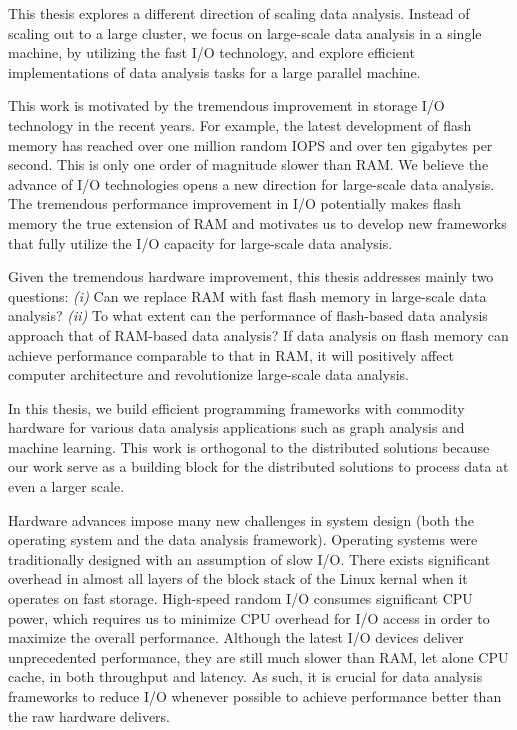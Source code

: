 This thesis explores a different direction of scaling data analysis. Instead
of scaling out to a large cluster, we focus on large-scale data analysis in
a single machine, by utilizing the fast I/O technology, and explore
efficient implementations of data analysis tasks for a large parallel machine.

This work is motivated
by the tremendous improvement in storage I/O technology in the recent years.
For example, the latest development of flash memory \cite{fusionio, safs} has
reached over one million random IOPS and over ten gigabytes per second. This
is only one order of magnitude slower than RAM. We believe the advance of
I/O technologies opens a new direction for large-scale data analysis.
The tremendous performance
improvement in I/O potentially makes flash memory the true extension of RAM
and motivates us to develop new frameworks that fully utilize the I/O capacity
for large-scale data analysis.

Given the tremendous hardware improvement, this thesis addresses mainly two
questions: \textit{(i)} Can we replace RAM with fast flash memory in large-scale
data analysis? \textit{(ii)} To what extent
can the performance of flash-based data analysis approach that of RAM-based
data analysis? If data analysis on flash memory can achieve performance comparable to
that in RAM, it will positively affect computer architecture and revolutionize
large-scale data analysis.

In this thesis, we build
efficient programming frameworks with commodity hardware for various
data analysis applications such as graph analysis and machine learning.
This work is orthogonal to the distributed solutions because our work serve as
a building block
for the distributed solutions to process data at even a larger scale.

Hardware advances impose many new challenges in system design (both the operating
system and the data analysis framework). Operating systems were traditionally
designed with an assumption of slow I/O. There exists significant overhead in
almost all layers of the block stack of the Linux kernal when it operates on
fast storage. High-speed random I/O consumes significant CPU power, which
requires us to minimize CPU overhead for I/O access in order to maximize
the overall performance. Although the latest I/O devices deliver unprecedented
performance, they are still much slower than RAM, let alone CPU cache, in both
throughput and latency. As such, it is crucial for data analysis frameworks to
reduce I/O whenever
possible to achieve performance better than the raw hardware delivers.

